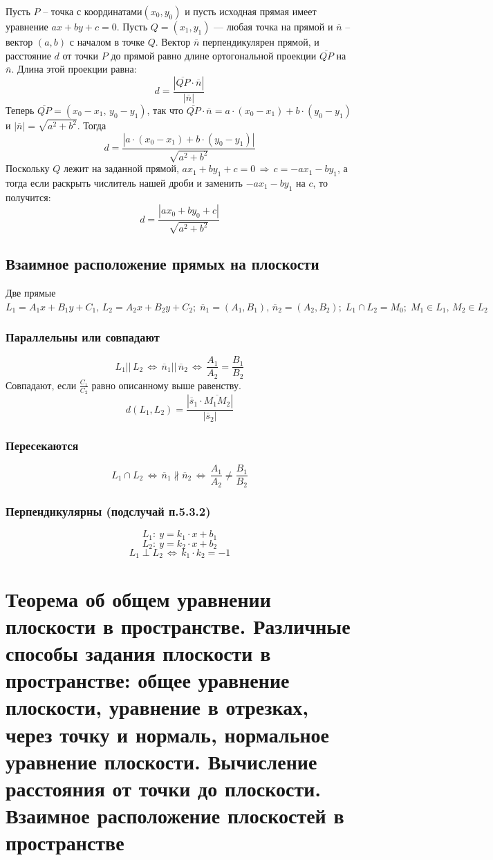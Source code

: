 \documentclass{article}
\begin{document}
Пусть $P$ -- точка с координатами$(x_0 , y_0 )$ и пусть
исходная прямая имеет уравнение $ax + by + c = 0$. Пусть $Q = ( x_1 , y_1 )$ — любая точка на
прямой и $\overline{n}$ -- вектор $( a , b )$ с началом в точке $Q$. Вектор $\overline{n}$ перпендикулярен прямой, и
расстояние $d$ от точки $P$ до прямой равно длине ортогональной проекции $\overline{QP }$ на $\overline{n}$.
Длина этой проекции равна:
$$ d = \frac{|\overline{QP}\cdot\overline{n}|}{|\overline{n}|} $$
Теперь
$\overline{QP} = (x_0 - x_1, \,y_0 - y_1)$, так что $\overline{QP}\cdot\overline{n} = a\cdot(x_0 - x_1) + b\cdot(y_0 - y_1)$ и $|\overline{n}| = \sqrt{a^2+b^2}$. Тогда
$$ d = \frac{|a\cdot(x_0 - x_1) + b\cdot(y_0 - y_1)|}{\sqrt{a^2+b^2}}$$
Поскольку $Q$ лежит на заданной прямой, $ax_1 + by_1 + c = 0\,\Rightarrow\, c = - ax_1 - by_1$, а тогда если
раскрыть числитель нашей дроби и заменить $- ax_1 - by_1$ на $c$, то получится:
$$ d=\frac{|ax_0+by_0+c|}{\sqrt{a^2+b^2}} $$
\newpage
\subsection{Взаимное расположение прямых на плоскости}
Две прямые $L_1=A_1x+B_1y+C_1,\,L_2=A_2x+B_2y+C_2;\;\overline{n}_1=(A_1,B_1),\,\overline{n}_2=(A_2,B_2);\;L_1\cap L_2=M_0;\; M_1\in L_1,\, M_2\in L_2$
\subsubsection{Параллельны или совпадают}
    $$ L_1 ||\,L_2\,\Leftrightarrow\,\overline{n}_1||\,\overline{n}_2\,\Leftrightarrow\,\frac{A_1}{A_2}=\frac{B_1}{B_2} $$
    Совпадают, если $\frac{C_1}{C_2}$ равно описанному выше равенству.
    $$ d(L_1,L_2)=\frac{|\overline{s}_1\cdot\overline{M_1M_2}|}{|\overline{s}_2|} $$
\subsubsection{Пересекаются}
    $$ L_1\cap L_2\,\Leftrightarrow\,\overline{n}_1\nparallel\overline{n}_2\,\Leftrightarrow\, \frac{A_1}{A_2}\neq\frac{B_1}{B_2}$$
\subsubsection{Перпендикулярны (подслучай п.5.3.2)}
    $$ L_1:\:y=k_1\cdot x+b_1 $$
    $$ L_2:\:y=k_2\cdot x+b_2 $$
    $$ L_1\perp L_2\,\Leftrightarrow\, k_1\cdot k_2=-1 $$

\newpage
\section{Теорема об общем уравнении плоскости в пространстве. Различные способы задания плоскости в пространстве: общее уравнение плоскости, уравнение в отрезках, через точку и нормаль, нормальное уравнение плоскости. Вычисление расстояния от точки до плоскости. Взаимное расположение плоскостей в пространстве}
\end{document}
